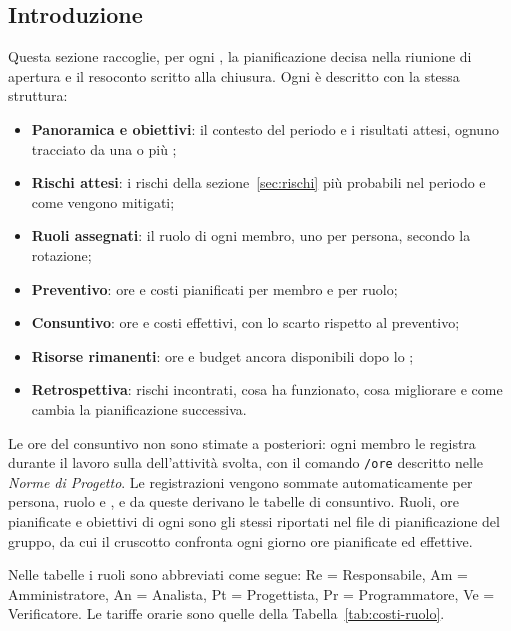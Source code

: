 \documentclass[documento]{gpt}
\begin{document}
\subsection{Introduzione}
Questa sezione raccoglie, per ogni , la pianificazione
decisa nella riunione di apertura e il resoconto scritto alla chiusura.
Ogni  è descritto con la stessa struttura:
\begin{itemize}
  \item \textbf{Panoramica e obiettivi}: il contesto del periodo e i
        risultati attesi, ognuno tracciato da una o più ;
  \item \textbf{Rischi attesi}: i rischi della sezione~\ref{sec:rischi}
        più probabili nel periodo e come vengono mitigati;
  \item \textbf{Ruoli assegnati}: il ruolo di ogni membro, uno per
        persona, secondo la rotazione;
  \item \textbf{Preventivo}: ore e costi pianificati per membro e per ruolo;
  \item \textbf{Consuntivo}: ore e costi effettivi, con lo scarto rispetto
        al preventivo;
  \item \textbf{Risorse rimanenti}: ore e budget ancora disponibili dopo
        lo ;
  \item \textbf{Retrospettiva}: rischi incontrati, cosa ha funzionato,
        cosa migliorare e come cambia la pianificazione successiva.
\end{itemize}

Le ore del consuntivo non sono stimate a posteriori: ogni membro le
registra durante il lavoro sulla  dell'attività svolta, con
il comando \texttt{/ore} descritto nelle \textit{Norme di Progetto}. Le
registrazioni vengono sommate automaticamente per persona, ruolo e
, e da queste derivano le tabelle di consuntivo. Ruoli,
ore pianificate e obiettivi di ogni  sono gli stessi
riportati nel file di pianificazione del gruppo, da cui il cruscotto
confronta ogni giorno ore pianificate ed effettive.

Nelle tabelle i ruoli sono abbreviati come segue: Re = Responsabile,
Am = Amministratore, An = Analista, Pt = Progettista, Pr = Programmatore,
Ve = Verificatore. Le tariffe orarie sono quelle della
Tabella~\ref{tab:costi-ruolo}.

\end{document}
